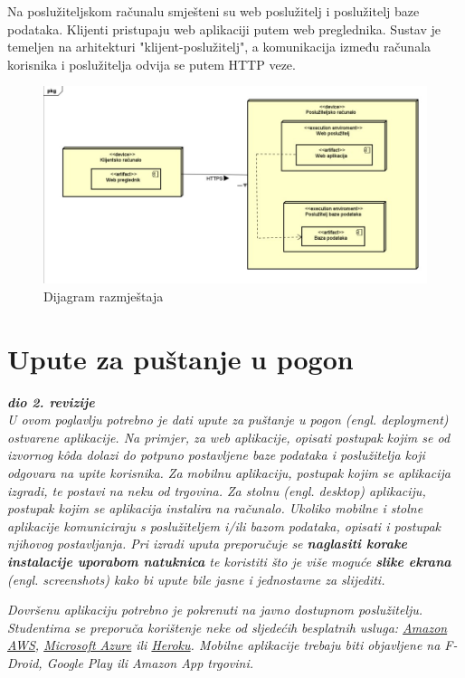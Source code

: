 			Na poslužiteljskom računalu smješteni su web poslužitelj i poslužitelj baze podataka. Klijenti pristupaju web aplikaciji putem web preglednika. Sustav je temeljen na arhitekturi "klijent-poslužitelj", a komunikacija između računala korisnika i poslužitelja odvija se putem HTTP veze.
			
			\begin{figure}[H]
				\includegraphics[width=\textwidth]{dijagram_razmjestaja.JPEG}
				\centering
				\caption{Dijagram razmještaja}
				\label{fig:dijagramrazmjestaja}
			\end{figure}
			
			\eject 
		
		\section{Upute za puštanje u pogon}
		
			\textbf{\textit{dio 2. revizije}}\\
		
			 \textit{U ovom poglavlju potrebno je dati upute za puštanje u pogon (engl. deployment) ostvarene aplikacije. Na primjer, za web aplikacije, opisati postupak kojim se od izvornog kôda dolazi do potpuno postavljene baze podataka i poslužitelja koji odgovara na upite korisnika. Za mobilnu aplikaciju, postupak kojim se aplikacija izgradi, te postavi na neku od trgovina. Za stolnu (engl. desktop) aplikaciju, postupak kojim se aplikacija instalira na računalo. Ukoliko mobilne i stolne aplikacije komuniciraju s poslužiteljem i/ili bazom podataka, opisati i postupak njihovog postavljanja. Pri izradi uputa preporučuje se \textbf{naglasiti korake instalacije uporabom natuknica} te koristiti što je više moguće \textbf{slike ekrana} (engl. screenshots) kako bi upute bile jasne i jednostavne za slijediti.}
			
			
			 \textit{Dovršenu aplikaciju potrebno je pokrenuti na javno dostupnom poslužitelju. Studentima se preporuča korištenje neke od sljedećih besplatnih usluga: \href{https://aws.amazon.com/}{Amazon AWS}, \href{https://azure.microsoft.com/en-us/}{Microsoft Azure} ili \href{https://www.heroku.com/}{Heroku}. Mobilne aplikacije trebaju biti objavljene na F-Droid, Google Play ili Amazon App trgovini.}
			
			
			\eject 